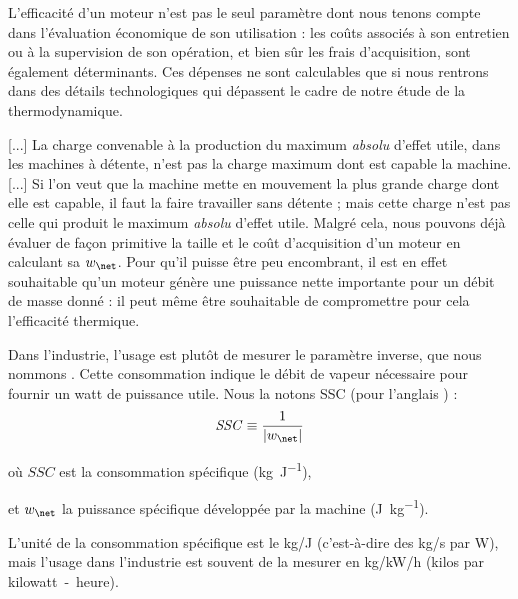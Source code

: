 		L’efficacité d’un moteur n’est pas le seul paramètre dont nous tenons compte dans l’évaluation économique de son utilisation : les coûts associés à son entretien ou à la supervision de son opération, et bien sûr les frais d’acquisition, sont également déterminants. Ces dépenses ne sont calculables que si nous rentrons dans des détails technologiques qui dépassent le cadre de notre étude de la thermodynamique.
		
			[...] La charge convenable à la production du maximum \emph{absolu} d’effet utile, dans les machines à détente, n’est pas la charge maximum dont est capable la machine. [...] Si l’on veut que la machine mette en mouvement la plus grande charge dont elle est capable, il faut la faire travailler sans détente ; mais cette charge n’est pas celle qui produit le maximum \emph{absolu} d’effet utile. 
		Malgré cela, nous pouvons déjà évaluer de façon primitive la taille et le coût d’acquisition d’un moteur en calculant sa  $w_\net$. Pour qu’il puisse être peu encombrant, il est en effet souhaitable qu’un moteur génère une puissance nette importante pour un débit de masse donné : il peut même être souhaitable de compromettre pour cela l’efficacité thermique.
			
		Dans l’industrie, l’usage est plutôt de mesurer le paramètre inverse, que nous nommons . Cette consommation indique le débit de vapeur nécessaire pour fournir un watt de puissance utile. Nous la notons SSC (pour l’anglais ) :
		\begin{equation}
			\mathit{SSC} \equiv  \frac{1}{|w_\net|}
		\end{equation}
		\begin{equationterms}
			\item où \tab $SSC$ 		\tab est la consommation spécifique (\si{\kilogram\per\joule}),
			\item et \tab $w_\net$ 	\tab la puissance spécifique développée par la machine (\si{\joule\per\kilogram}).
		\end{equationterms}

		L’unité de la consommation spécifique est le \si[per-mode = symbol]{\kilogram\per\joule} (c’est-à-dire des \si[per-mode = symbol]{\kilogram\per\second} par \si{\watt}), mais l’usage dans l’industrie est souvent de la mesurer en \si[per-mode = symbol]{\kilogram\per\kilo\watt\per\hour} (\si{kilos} par \si{kilowatt-heure}).

